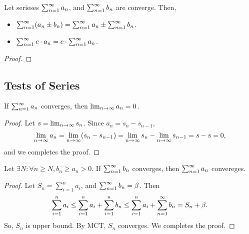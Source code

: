 
\begin{theorem}
  Let serieses $\sum_{n=1}^{\infty} a_n$, and $\sum_{n=1}^{\infty} b_n$ are
  converge. Then,
  \begin{itemize}
    \item $\sum_{n=1}^{\infty} (a_n \pm b_n) = \sum_{n=1}^{\infty} a_n \pm \sum_{n=1}^{\infty} b_n$.
    \item $\sum_{n=1}^{\infty} c \cdot a_n = c \cdot \sum_{n=1}^{\infty} a_n$.
  \end{itemize}
  \label{thm:ser_lin} %
\end{theorem}
\begin{proof}

\end{proof}


\subsection{Tests of Series}

\begin{theorem}
  If $\sum_{n=1}^{\infty} a_n$ converges, then $\lim_{n \to \infty} a_n = 0$.
  \label{thm:ser_test_div}
\end{theorem}
\begin{proof}
  Let $s = \lim_{n \to \infty} s_n$. Since $a_n = s_n - s_{n-1}$,
  \begin{equation}
    \lim_{n \to \infty} a_n = \lim_{n \to \infty} (s_n - s_{n-1}) = \lim_{n \to \infty} s_n - \lim_{n \to \infty} s_{n-1} = s - s = 0,
  \end{equation}
  and we completes the proof.
\end{proof}

\begin{theorem}
  Let $\exists N: \forall n \ge N, b_n \ge a_n > 0$. If $\sum_{n=1}^{\infty} b_n$ converges, then
  $\sum_{n=1}^{\infty} a_n$ convereges.
  \label{thm:ser_test_comp}
\end{theorem}
\begin{proof}
  Let $S_n = \sum_{i=1}^n a_i$, and $\sum_{n=1}^{\infty} b_n = \beta$. Then
  \begin{equation}
    \sum_{i = 1}^{n} a_i \le \sum_{i = 1}^{n} a_i + \sum_{i = 1}^{n} b_n \le \sum_{i = 1}^{n} a_i + \sum_{n=1}^{\infty} b_n = S_n + \beta.
  \end{equation}
  So, $S_n$ is upper bound. By MCT, $S_n$ converges. We completes the proof.
\end{proof}

